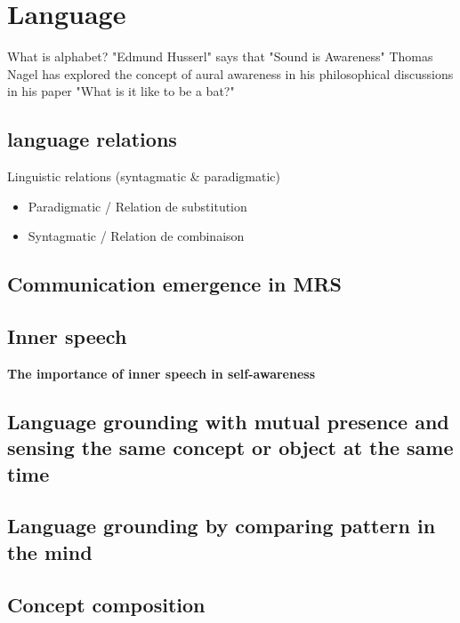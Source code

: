 \chapter{Language}

What is alphabet? "Edmund Husserl" says that "Sound is Awareness" Thomas Nagel has explored the concept of aural awareness in his philosophical discussions in his paper "What is it like to be a bat?"

    \section{language relations}
        Linguistic relations (syntagmatic \& paradigmatic)
        \begin{itemize}
            \item Paradigmatic / Relation de substitution
            \item Syntagmatic / Relation de combinaison
        \end{itemize}

    \section{Communication emergence in MRS}

    \section{Inner speech}
        \textbf{The importance of inner speech in self-awareness} 

    \section{Language grounding with mutual presence and sensing the same concept or object at the same time}

    \section{Language grounding by comparing pattern in the mind}

    \section{Concept composition}

